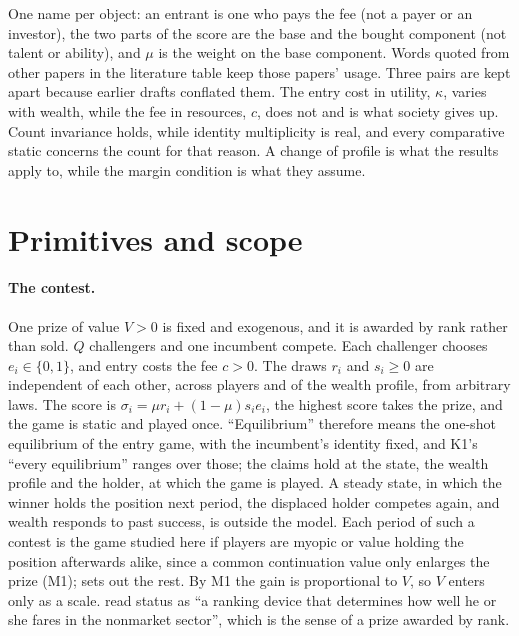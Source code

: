 One name per object: an entrant is one who pays the fee (not a payer or an
investor), the two parts of the score are the base and the bought component
(not talent or ability), and $\mu$ is the weight on the base component. Words
quoted from other papers in the literature table keep those papers' usage.
Three pairs are kept apart because earlier drafts conflated them. The entry
cost in utility, $\kappa$, varies with wealth, while the fee in resources, $c$,
does not and is what society gives up. Count invariance holds, while identity
multiplicity is real, and every comparative static concerns the count for that
reason. A change of profile is what the results apply to, while the margin
condition is what they assume.

\section{Primitives and scope}
\label{app:primitives}

\paragraph{The contest.} One prize of value $V>0$ is fixed and exogenous, and
it is awarded by rank rather than sold. $Q$ challengers and one incumbent
compete. Each challenger chooses $e_i\in\{0,1\}$, and entry costs the fee $c>0$.
The draws $r_i$ and $s_i\ge0$ are independent of each other, across players and
of the wealth profile, from arbitrary laws. The score is
$\sigma_i=\mu r_i+(1-\mu)s_ie_i$, the highest score takes the prize, and the game
is static and played once. ``Equilibrium'' therefore means the one-shot
equilibrium of the entry game, with the incumbent's identity fixed, and K1's
``every equilibrium'' ranges over those; the claims hold at the state, the
wealth profile and the holder, at which the game is played. A steady state, in
which the winner holds the position next period, the displaced holder competes
again, and wealth responds to past success, is outside the model. Each period of
such a contest is the game studied here if players are myopic or value holding
the position afterwards alike, since a common continuation value only enlarges
the prize (M1);  sets out the rest. By M1 the gain is proportional to $V$, so $V$
enters only as a scale. \citet{ColeMailathPostlewaite1992} read status as ``a ranking
device that determines how well he or she fares in the nonmarket sector'', which
is the sense of a prize awarded by rank.

